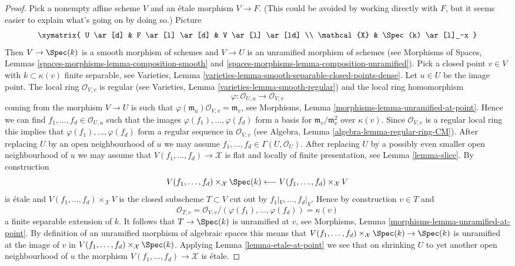 \begin{proof}
\medskip\noindent
Pick a nonempty affine scheme $V$ and an \'etale morphism $V \to F$.
(This could be avoided by working directly with $F$, but it seems easier
to explain what's going on by doing so.) Picture
$$
\xymatrix{
U \ar[d] & F  \ar[l] \ar[d] & V \ar[l] \ar[ld] \\
\mathcal{X} & \Spec(k) \ar[l]_-x
}
$$
Then $V \to \Spec(k)$ is a smooth morphism of schemes and $V \to U$ is an
unramified morphism of schemes (see
Morphisms of Spaces, Lemmas
\ref{spaces-morphisms-lemma-composition-smooth} and
\ref{spaces-morphisms-lemma-composition-unramified}).
Pick a closed point $v \in V$ with $k \subset \kappa(v)$ finite separable, see
Varieties, Lemma \ref{varieties-lemma-smooth-separable-closed-points-dense}.
Let $u \in U$ be the image point. The local ring
$\mathcal{O}_{V, v}$ is regular (see
Varieties, Lemma \ref{varieties-lemma-smooth-regular})
and the local ring homomorphism
$$
\varphi : \mathcal{O}_{U, u} \longrightarrow \mathcal{O}_{V, v}
$$
coming from the morphism $V \to U$ is such that
$\varphi(\mathfrak m_u)\mathcal{O}_{V, v} = \mathfrak m_v$, see
Morphisms, Lemma \ref{morphisms-lemma-unramified-at-point}.
Hence we can find $f_1, \ldots, f_d \in \mathcal{O}_{U, u}$
such that the images $\varphi(f_1), \ldots, \varphi(f_d)$
form a basis for $\mathfrak m_v/\mathfrak m_v^2$ over $\kappa(v)$.
Since $\mathcal{O}_{V, v}$ is a regular local ring this implies
that $\varphi(f_1), \ldots, \varphi(f_d)$ form a regular sequence
in $\mathcal{O}_{V, v}$ (see
Algebra, Lemma \ref{algebra-lemma-regular-ring-CM}).
After replacing $U$ by an open neighbourhood of $u$ we may assume
$f_1, \ldots, f_d \in \Gamma(U, \mathcal{O}_U)$. After replacing
$U$ by a possibly even smaller open neighbourhood of $u$ we may
assume that $V(f_1, \ldots, f_d) \to \mathcal{X}$ is flat and
locally of finite presentation, see
Lemma \ref{lemma-slice}.
By construction
$$
V(f_1, \ldots, f_d) \times_\mathcal{X} \Spec(k)
\longleftarrow
V(f_1, \ldots, f_d) \times_\mathcal{X} V
$$
is \'etale and $V(f_1, \ldots, f_d) \times_\mathcal{X} V$
is the closed subscheme $T \subset V$ cut out by $f_1|_V, \ldots, f_d|_V$.
Hence by construction $v \in T$ and
$$
\mathcal{O}_{T, v} =
\mathcal{O}_{V, v}/(\varphi(f_1), \ldots, \varphi(f_d)) = \kappa(v)
$$
a finite separable extension of $k$. It follows that $T \to \Spec(k)$
is unramified at $v$, see
Morphisms, Lemma \ref{morphisms-lemma-unramified-at-point}.
By definition of an unramified morphism of algebraic spaces this means that
$V(f_1, \ldots, f_d) \times_\mathcal{X} \Spec(k) \to \Spec(k)$
is unramified at the image of $v$ in
$V(f_1, \ldots, f_d) \times_\mathcal{X} \Spec(k)$.
Applying
Lemma \ref{lemma-etale-at-point}
we see that on shrinking $U$ to yet another open neighbourhood of $u$
the morphism $V(f_1, \ldots, f_d) \to \mathcal{X}$ is \'etale.


\end{proof}
